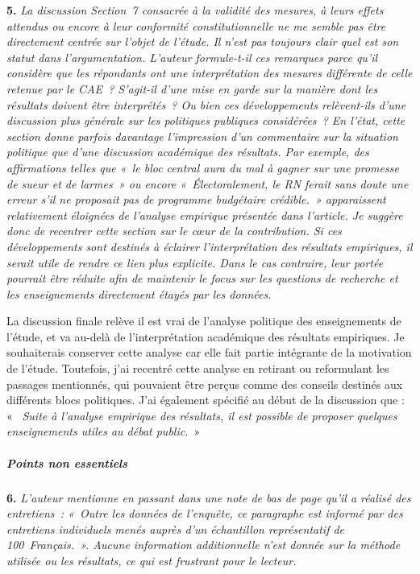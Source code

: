 \documentclass[12pt,french]{article}
\begin{document}
\bigskip
\noindent\textbf{5.} \textit{La discussion Section~7 consacrée à la validité des mesures, à leurs effets attendus ou encore à leur conformité constitutionnelle ne me semble pas être directement centrée sur l'objet de l'étude. Il n'est pas toujours clair quel est son statut dans l'argumentation. L'auteur formule-t-il ces remarques parce qu'il considère que les répondants ont une interprétation des mesures différente de celle retenue par le CAE~? S'agit-il d'une mise en garde sur la manière dont les résultats doivent être interprétés~? Ou bien ces développements relèvent-ils d'une discussion plus générale sur les politiques publiques considérées~? En l'état, cette section donne parfois davantage l'impression d'un commentaire sur la situation politique que d'une discussion académique des résultats. Par exemple, des affirmations telles que «~le bloc central aura du mal à gagner sur une promesse de sueur et de larmes~» ou encore «~Électoralement, le RN ferait sans doute une erreur s'il ne proposait pas de programme budgétaire crédible.~» apparaissent relativement éloignées de l'analyse empirique présentée dans l'article. Je suggère donc de recentrer cette section sur le cœur de la contribution. Si ces développements sont destinés à éclairer l'interprétation des résultats empiriques, il serait utile de rendre ce lien plus explicite. Dans le cas contraire, leur portée pourrait être réduite afin de maintenir le focus sur les questions de recherche et les enseignements directement étayés par les données.}

La discussion finale relève il est vrai de l'analyse politique des enseignements de l'étude, et va au-delà de l'interprétation académique des résultats empiriques. Je souhaiterais conserver cette analyse car elle fait partie intégrante de la motivation de l'étude. Toutefois, j'ai recentré cette analyse en retirant ou reformulant les passages mentionnés, qui pouvaient être perçus comme des conseils destinés aux différents blocs politiques. J'ai également spécifié au début de la discussion que : «~\textit{
Suite à l'analyse empirique des résultats, il est possible de proposer quelques enseignements utiles au débat public.}~» 

\subparagraph*{Points non essentiels}

\bigskip
\noindent\textbf{6.} \textit{L'auteur mentionne en passant dans une note de bas de page qu'il a réalisé des entretiens~: «~Outre les données de l'enquête, ce paragraphe est informé par des entretiens individuels menés auprès d'un échantillon représentatif de 100~Français.~». Aucune information additionnelle n'est donnée sur la méthode utilisée ou les résultats, ce qui est frustrant pour le lecteur.}
\end{document}
